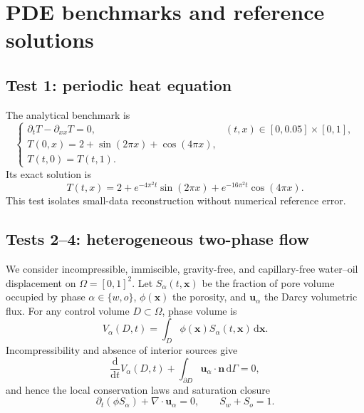\section{PDE benchmarks and reference solutions}
\label{sec:benchmarks}

\subsection{Test 1: periodic heat equation}

The analytical benchmark is
\begin{equation}
\begin{cases}
    \partial_t T-\partial_{xx}T=0,
        &(t,x)\in[0,0.05]\times[0,1],\\
    T(0,x)=2+\sin(2\pi x)+\cos(4\pi x),\\
    T(t,0)=T(t,1).
\end{cases}
\label{eq:heat}
\end{equation}
Its exact solution is
\begin{equation}
    T(t,x)=2+e^{-4\pi^2t}\sin(2\pi x)
    +e^{-16\pi^2t}\cos(4\pi x).
\end{equation}
This test isolates small-data reconstruction without numerical reference error.

\subsection{Tests 2--4: heterogeneous two-phase flow}

We consider incompressible, immiscible, gravity-free, and capillary-free water--oil displacement on \(\Omega=[0,1]^2\). Let \(S_\alpha(t,\boldsymbol x)\) be the fraction of pore volume occupied by phase \(\alpha\in\{w,o\}\), \(\phi(\boldsymbol x)\) the porosity, and \(\boldsymbol u_\alpha\) the Darcy volumetric flux. For any control volume \(D\subset\Omega\), phase volume is
\begin{equation}
    V_\alpha(D,t)=\int_D\phi(\boldsymbol x)
    S_\alpha(t,\boldsymbol x)\,\mathrm d\boldsymbol x.
\end{equation}
Incompressibility and absence of interior sources give
\begin{equation}
    \frac{\mathrm d}{\mathrm dt}V_\alpha(D,t)
    +\int_{\partial D}\boldsymbol u_\alpha\cdot\boldsymbol n
    \,\mathrm d\Gamma=0,
\end{equation}
and hence the local conservation laws and saturation closure
\begin{equation}
    \partial_t(\phi S_\alpha)+\nabla\cdot\boldsymbol u_\alpha=0,
    \qquad S_w+S_o=1.
    \label{eq:conservation}
\end{equation}

